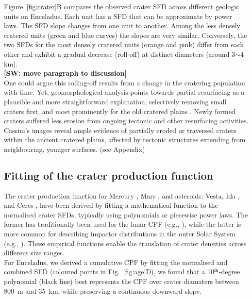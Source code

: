 \documentclass[preprint,11pt,3p,times,authoryear]{elsarticle}
\begin{document}
{Figure~\ref{fig:crater}B compares the observed crater SFD across different geologic units on Enceladus. Each unit has a SFD that can be approximate by power laws. The SFD slope changes from one unit to another. Among the less densely cratered units (green and blue curves) the slopes are very similar. Conversely, the two SFDs for the most densely cratered units (orange and pink) differ from each other and exhibit a gradual decrease (roll-off) at distinct diameters (around 3$\sim$4 km).\\

\textbf{[SW: move paragraph to discussion]\\}
One could argue this rolling-off results from a change in the cratering population with time. Yet, geomorphological analysis points towards partial resurfacing as a plausible and more straightforward explanation, selectively removing small craters first, and most prominently for the old cratered plains \citep{Michael2010}. Newly formed craters suffered less erosion from ongoing tectonic and other resurfacing activities. Cassini’s images reveal ample evidence of partially eroded or traversed craters within the ancient cratered plains, affected by tectonic structures extending from neighbouring, younger surfaces. (see Appendix)\\


\subsection{Fitting of the crater production function}
\label{subsec:fitting}
The crater production function for Mercury \citep{Neukum2001}, Mars \citep{Ivanov2001, Hartmann2005}, and asteroids: Vesta, Ida \citep{Schmedemann2014}, and Ceres \citep{Hiesinger2016}, have been derived by fitting a mathematical function to the normalised crater SFDs, typically using polynomials or piecewise power laws. The former has traditionally been used for the lunar CPF (e.g., \citealt{Neukum2001}), while the latter is more common for describing impactor distributions in the outer Solar System (e.g., \citealt{Zahnle2003}). These empirical functions enable the translation of crater densities across different size ranges. \\

For Enceladus, we derived a cumulative CPF by fitting the normalised and combined SFD (coloured points in Fig.~\ref{fig:age}D), we found that a 10$^{\rm th}$-degree polynomial (black line) best represents the CPF over crater diamaters between 800~m and 35~km, while preserving a continuous downward slope. \\

}
\end{document}
